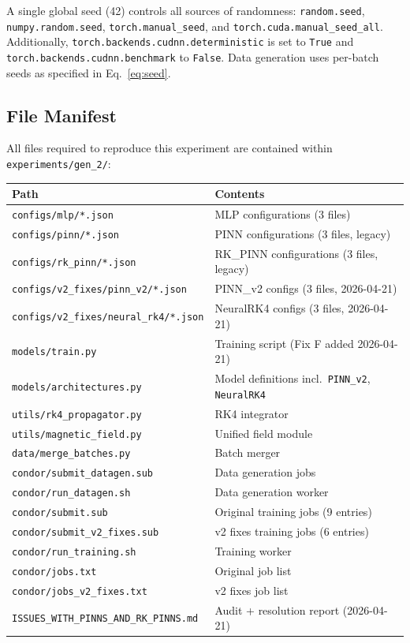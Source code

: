 \documentclass[a4paper,11pt]{article}
\begin{document}
\begin{sloppypar}
A single global seed (42) controls all sources of randomness:
\nolinkurl{random.seed}, \nolinkurl{numpy.random.seed},
\nolinkurl{torch.manual_seed}, and
\nolinkurl{torch.cuda.manual_seed_all}.
Additionally,
\nolinkurl{torch.backends.cudnn.deterministic} is set to \texttt{True} and
\nolinkurl{torch.backends.cudnn.benchmark} to \texttt{False}.
Data generation uses per-batch seeds as specified in
Eq.~\eqref{eq:seed}.
\end{sloppypar}

\subsection{File Manifest}

All files required to reproduce this experiment are contained within
\texttt{experiments/gen\_2/}:
\begin{center}
\begin{tabular}{ll}
\toprule
Path & Contents \\
\midrule
\texttt{configs/mlp/*.json}     & MLP configurations (3 files) \\
\texttt{configs/pinn/*.json}    & PINN configurations (3 files, legacy) \\
\texttt{configs/rk\_pinn/*.json}& RK\_PINN configurations (3 files, legacy) \\
\texttt{configs/v2\_fixes/pinn\_v2/*.json}    & PINN\_v2 configs (3 files, 2026-04-21) \\
\texttt{configs/v2\_fixes/neural\_rk4/*.json} & NeuralRK4 configs (3 files, 2026-04-21) \\
\texttt{models/train.py}        & Training script (Fix F added 2026-04-21) \\
\texttt{models/architectures.py}& Model definitions incl.\ \texttt{PINN\_v2}, \texttt{NeuralRK4} \\
\texttt{utils/rk4\_propagator.py}& RK4 integrator \\
\texttt{utils/magnetic\_field.py}& Unified field module \\
\texttt{data/merge\_batches.py} & Batch merger \\
\texttt{condor/submit\_datagen.sub} & Data generation jobs \\
\texttt{condor/run\_datagen.sh}     & Data generation worker \\
\texttt{condor/submit.sub}          & Original training jobs (9 entries) \\
\texttt{condor/submit\_v2\_fixes.sub} & v2 fixes training jobs (6 entries) \\
\texttt{condor/run\_training.sh}    & Training worker \\
\texttt{condor/jobs.txt}            & Original job list \\
\texttt{condor/jobs\_v2\_fixes.txt} & v2 fixes job list \\
\texttt{ISSUES\_WITH\_PINNS\_AND\_RK\_PINNS.md} & Audit + resolution report (2026-04-21) \\
\bottomrule
\end{tabular}
\end{center}
\end{document}
